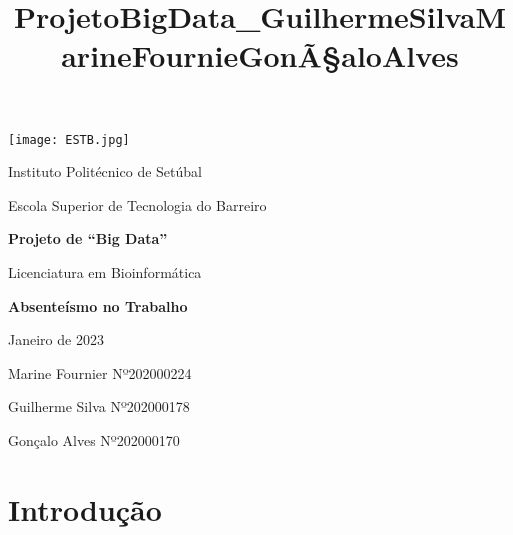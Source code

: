 \documentclass[11pt]{article}
\title{ProjetoBigData\_GuilhermeSilvaMarineFournieGonÃ§aloAlves}
\begin{document}
    
\thispagestyle{empty}
\begin{flushleft}
\texttt{[image: ESTB.jpg]}
\end{flushleft}

\newline

\begin{center}
\Large{Instituto Politécnico de Setúbal}
\end{center}

\begin{center}
\Large{Escola Superior de Tecnologia do Barreiro}
\end{center}

\medskip %


\begin{center}
\Large{\textbf{Projeto de ``Big Data''}}
\end{center}
\begin{center}
\Large{Licenciatura em Bioinformática}
\end{center}

\vspace{3cm} %

\begin{center}
\huge{\textbf{Absenteísmo no Trabalho}} 
\end{center}


\begin{center}
\Large{Janeiro de 2023}
\end{center}

\vspace{2cm}

\medskip
\begin{center}

\large{Marine Fournier Nº202000224}

\large{Guilherme Silva Nº202000178}

\large{Gonçalo Alves Nº202000170}

\end{center}   

\pagebreak 

\newpage
{}

\tableofcontents
\listoffigures

\newpage
{}


    \hypertarget{introduuxe7uxe3o}{%
\section{Introdução}\label{introduuxe7uxe3o}}
\end{document}
